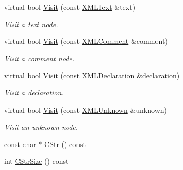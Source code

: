 \begin{DoxyCompactItemize}
\mbox{\label{classtinyxml2_1_1XMLPrinter_a275ae25544a12199ae40b6994ca6e4de}} 
virtual bool \hyperlink{classtinyxml2_1_1XMLPrinter_a275ae25544a12199ae40b6994ca6e4de}{Visit} (const \hyperlink{classtinyxml2_1_1XMLText}{X\+M\+L\+Text} \&text)
\begin{DoxyCompactList}\small\item\em Visit a text node. \end{DoxyCompactList}\item 
\mbox{\label{classtinyxml2_1_1XMLPrinter_a3f16a30be1537ac141d9bd2db824ba9e}} 
virtual bool \hyperlink{classtinyxml2_1_1XMLPrinter_a3f16a30be1537ac141d9bd2db824ba9e}{Visit} (const \hyperlink{classtinyxml2_1_1XMLComment}{X\+M\+L\+Comment} \&comment)
\begin{DoxyCompactList}\small\item\em Visit a comment node. \end{DoxyCompactList}\item 
\mbox{\label{classtinyxml2_1_1XMLPrinter_a9ceff5cd85e5db65838962174fcdcc46}} 
virtual bool \hyperlink{classtinyxml2_1_1XMLPrinter_a9ceff5cd85e5db65838962174fcdcc46}{Visit} (const \hyperlink{classtinyxml2_1_1XMLDeclaration}{X\+M\+L\+Declaration} \&declaration)
\begin{DoxyCompactList}\small\item\em Visit a declaration. \end{DoxyCompactList}\item 
\mbox{\label{classtinyxml2_1_1XMLPrinter_aa15e1da81e17dea5da6499ac5b08d9d8}} 
virtual bool \hyperlink{classtinyxml2_1_1XMLPrinter_aa15e1da81e17dea5da6499ac5b08d9d8}{Visit} (const \hyperlink{classtinyxml2_1_1XMLUnknown}{X\+M\+L\+Unknown} \&unknown)
\begin{DoxyCompactList}\small\item\em Visit an unknown node. \end{DoxyCompactList}\item 
const char $\ast$ \hyperlink{classtinyxml2_1_1XMLPrinter_a180671d73844f159f2d4aafbc11d106e}{C\+Str} () const
\item 
int \hyperlink{classtinyxml2_1_1XMLPrinter_a3256cf3523d4898b91abb18b924be04c}{C\+Str\+Size} () const
\end{DoxyCompactItemize}


